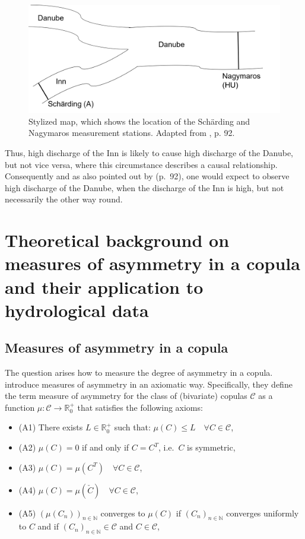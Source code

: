 \documentclass[
]{krantz}
\providecommand{\tightlist}{%
  \setlength{\itemsep}{0pt}\setlength{\parskip}{0pt}}
\begin{document}
\begin{figure}

{\centering \includegraphics[width=0.7\linewidth]{./work/04-archimax/figures/Map_Inn_Danube_v02} 

}

\caption{Stylized map, which shows the location of the Schärding and Nagymaros measurement stations. Adapted from \citet{genest2013}, p. 92.}\label{fig:stylizedMapClaudia}
\end{figure}

Thus, high discharge of the Inn is likely to cause high discharge of the Danube, but not vice versa, where this circumstance describes a causal relationship. Consequently and as also pointed out by \citet{genest2013} (p.~92), one would expect to observe high discharge of the Danube, when the discharge of the Inn is high, but not necessarily the other way round.

\section{Theoretical background on measures of asymmetry in a copula and their application to hydrological data}\label{backgrmeas}

\subsection{Measures of asymmetry in a copula}\label{measures-of-asymmetry-in-a-copula}

The question arises how to measure the degree of asymmetry in a copula. \citet{durante2010a} introduce measures of asymmetry in an axiomatic way. Specifically, they define the term measure of asymmetry for the class of (bivariate) copulas \(\mathcal{C}\) as a function \(\mu:\mathcal{C} \rightarrow \mathbb{R}^+_0\) that satisfies the following axioms:

\begin{itemize}
\tightlist
\item
  (A1) There exists \(L \in \mathbb{R}^+_0\) such that: \(\mu(C) \leq L \quad \forall C \in \mathcal{C}\),
\item
  (A2) \(\mu(C) = 0\) if and only if \(C = C^T\), i.e.~\(C\) is symmetric,
\item
  (A3) \(\mu(C) = \mu(C^T) \quad \forall C \in \mathcal{C}\),
\item
  (A4) \(\mu(C) = \mu(\check{C}) \quad \forall C \in \mathcal{C}\),
\item
  (A5) \((\mu(C_n))_{n \in \mathbb{N}}\) converges to \(\mu(C)\) if \((C_n)_{n \in \mathbb{N}}\) converges uniformly to \(C\) and if \((C_n)_{n \in \mathbb{N}} \in \mathcal{C}\) and \(C  \in \mathcal{C}\),
\end{itemize}
\end{document}
